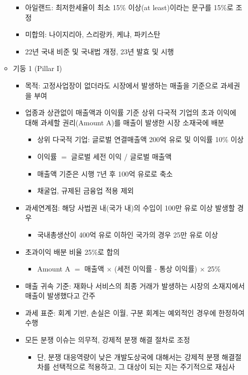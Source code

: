 \begin{itemize}
\begin{itemize}
\begin{itemize}
		\item 아일랜드: 최저한세율이 최소 15\% 이상(at least)이라는 문구를 15\%로 조정
		\item 미합의:  나이지리아, 스리랑카, 케냐, 파키스탄
		\item 22년 국내 비준 및 국내법 개정, 23년 발효 및 시행	
		\end{itemize}
	\item 기둥 1 (Pillar I) 
		\begin{itemize}
		\item 목적: 고정사업장이 없더라도 시장에서 발생하는 매출을 기준으로 과세권을 부여
		\item 업종과 상관없이 매출액과 이익률 기준 상위 다국적 기업의 초과 이익에 대해 과세할 권리(Amount A)를 매출이 발생한 시장 소재국에 배분 
			\begin{itemize}
			\item 상위 다국적 기업: 글로벌 연결매출액 200억 유로 및 이익률 10\% 이상
			\item 이익률 $=$ 글로벌 세전 이익 / 글로벌 매출액
			\item 매출액 기준은 시행 7년 후 100억 유로로 축소
			\item 채굴업, 규제된 금융업 적용 제외
			\end{itemize}
		\item 과세연계점: 해당 사법권 내(국가 내)의 수입이 100만 유로 이상 발생할 경우
			\begin{itemize}
			\item 국내총생산이 400억 유로 이하인 국가의 경우 25만 유로 이상
			\end{itemize} 
		\item 초과이익 배분 비율 25\%로 합의
			\begin{itemize}
			\item Amount A $ = $ 매출액 $\times$ (세전 이익률 - 통상 이익률) $\times$ 25\%
			\end{itemize}
		\item 매출 귀속 기준: 재화나 서비스의 최종 거래가 발생하는 시장의 소재지에서 매출이 발생했다고 간주
		\item 과세 표준: 회계 기반, 손실은 이월, 구분 회계는 예외적인 경우에 한정하여 수행	
		\item 모든 분쟁 이슈는 의무적, 강제적 분쟁 해결 절차로 조정
			\begin{itemize}
			\item 단,  분쟁 대응역량이 낮은 개발도상국에 대해서는 강제적 분쟁 해결절차를 선택적으로 적용하고, 그 대상이 되는 지는 주기적으로 재심사
			\end{itemize}

\end{itemize}
\end{itemize}
\end{itemize}
